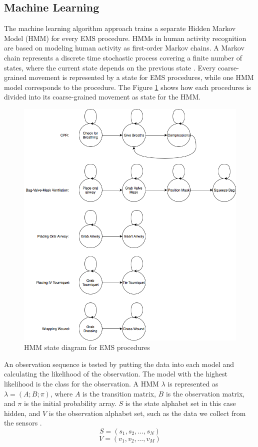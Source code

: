 \subsection{Machine Learning}
\label{sec:Approach:Machine-Learning}
The machine learning algorithm approach trains a separate Hidden Markov Model (HMM) for every EMS procedure. HMMs in human activity recognition are based on modeling human activity as first-order Markov chains. A Markov chain represents a discrete time stochastic process covering a finite number of states, where the current state depends on the previous state \cite{Faicel2013}. Every coarse-grained movement is represented by a state for EMS procedures, while one HMM model corresponds to the procedure. The Figure \ref{fig:HMM} shows how each procedures is divided into its coarse-grained movement as state for the HMM.
\begin{figure}
	\centering
	\includegraphics[width=0.7\linewidth]{pictures/HMM}
	\caption{HMM state diagram for EMS procedures}
	\label{fig:HMM}
\end{figure}
An observation sequence is tested by putting the data into each model and calculating the likelihood of the observation. The model with the highest likelihood is the class for the observation. A HMM $\lambda$ is represented as $\lambda = (A; B; \pi)$, where $A$ is the transition matrix, $B$ is the observation matrix, and $\pi$ is the initial probability array. $S$ is the state alphabet set in this case hidden, and $V$ is the observation alphabet set, such as the data we collect from the sensors \cite{Cheng2017}.
$$S=(s_1,s_2,\dots,s_N)$$
$$V=(v_1,v_2,\dots,v_M)$$
